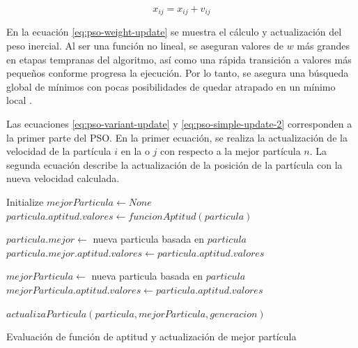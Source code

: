 \documentclass[letterpaper]{report}
\begin{document}
    \begin{equation}
      x_{ij} = x_{ij} + v_{ij}
      \label{eq:pso-simple-update-2}
    \end{equation}

    En la ecuación \ref{eq:pso-weight-update} se muestra el cálculo y
    actualización del peso inercial. Al ser una función no lineal, se aseguran
    valores de $w$ más grandes en etapas tempranas del algoritmo, así como una
    rápida transición a valores más pequeños conforme progresa la ejecución. Por
    lo tanto, se asegura una búsqueda global de mínimos con pocas posibilidades
    de quedar atrapado en un mínimo local \cite{APSO2016}. 

    Las ecuaciones \ref{eq:pso-variant-update} y \ref{eq:pso-simple-update-2}
    corresponden a la primer parte del PSO. En la primer ecuación, se realiza la
    actualización de la velocidad de la partícula $i$ en la o $j$ con
    respecto a la mejor partícula $n$. La segunda ecuación describe la
    actualización de la posición de la partícula con la nueva velocidad
    calculada.

    \begin{algorithm}[ht!]
      \begin{algorithmic}
        \State Initialize $mejorParticula \gets None$
            \State $particula.aptitud.valores \gets funcionAptitud(particula)$

              \State $particula.mejor \gets$ nueva particula basada en $particula$
              \State $particula.mejor.aptitud.valores \gets particula.aptitud.valores$
            \EndIf

              \State $mejorParticula \gets$ nueva particula basada en $particula$
              \State $mejorParticula.aptitud.valores \gets particula.aptitud.valores$
            \EndIf
          \EndFor 

            \State $actualizaParticula(particula, mejorParticula, generacion)$
          \EndFor
        \EndFor
        \caption{Evaluación de función de aptitud y actualización de mejor
          partícula}
        \label{alg:pso-variant-eval}
      \end{algorithmic}
    \end{algorithm}
\end{document}
